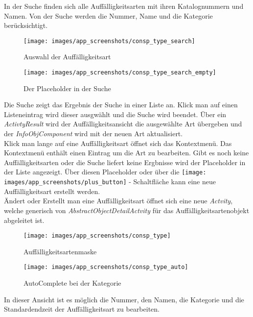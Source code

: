 In der Suche finden sich alle Auffälligkeitsarten mit ihren Katalognummern und Namen. Von der Suche werden die Nummer, Name und die Kategorie berücksichtigt. \\
\begin{figure}[H]
  \centering
  \begin{minipage}[t]{7 cm}
  	\centering
  	\texttt{[image: images/app\_screenshots/consp\_type\_search]} 
    \caption{Auswahl der Auffälligkeitsart}
  \end{minipage}
  \hspace{0.5cm}
  \begin{minipage}[t]{7 cm}
	\centering
	\texttt{[image: images/app\_screenshots/consp\_type\_search\_empty]}  
    \caption{Der Placeholder in der Suche}
  \end{minipage}
\end{figure}
Die Suche zeigt das Ergebnis der Suche in einer Liste an. Klick man auf einen Listeneintrag wird dieser ausgwählt und die Suche wird beendet. Über ein \textit{ActivtyResult} wird der Auffälligkeitsansicht die ausgewählte Art übergeben und der \textit{InfoObjComponent} wird mit der neuen Art aktualisiert. \\
Klick man lange auf eine Auffälligkeitsart öffnet sich das Kontextmenü. Das Kontextmenü enthält einen Eintrag um die Art zu bearbeiten.  
Gibt es noch keine Auffälligkeitsarten oder die Suche liefert keine Ergbnisse wird der Placeholder in der Liste angezeigt. Über diesen Placeholder oder über die \texttt{[image: images/app\_screenshots/plus\_button]} - Schaltfläche kann eine neue Auffälligkeitsart erstellt werden. \\
Ändert oder Erstellt man eine Auffälligkeitsart öffnet sich eine neue \textit{Actvity}, welche generisch von \textit{AbstractObjectDetailActvity} für das Auffälligkeitsartenobjekt abgeleitet ist.  
\begin{figure}[H]
  \centering
  \begin{minipage}[t]{7 cm}
  	\centering
  	\texttt{[image: images/app\_screenshots/consp\_type]} 
    \caption{Auffälligkeitsartenmaske}
  \end{minipage}
  \hspace{0.5cm}
  \begin{minipage}[t]{7 cm}
	\centering
	\texttt{[image: images/app\_screenshots/consp\_type\_auto]}  
    \caption{AutoComplete bei der Kategorie}
  \end{minipage}
\end{figure}
In dieser Ansicht ist es möglich die Nummer, den Namen, die Kategorie und die Standardendzeit der Auffälligkeitsart zu bearbeiten. \\
